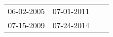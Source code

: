 \begin{supertabular}{llll}
 06-02-2005 &  07-01-2011 \\
 07-15-2009 &  07-24-2014 \\
\end{supertabular}
